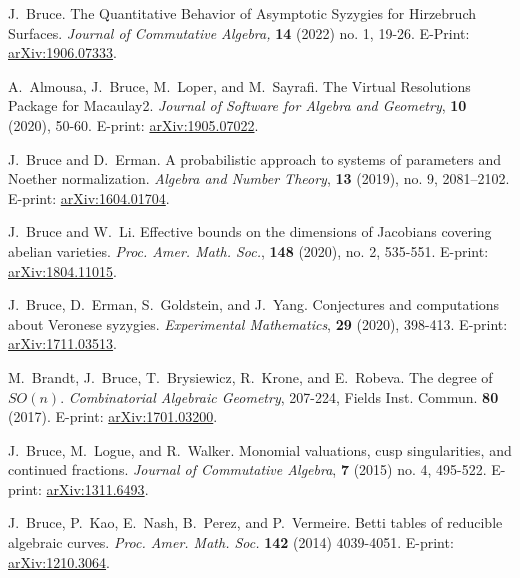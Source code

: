 \documentclass[letterpaper,11pt]{article}
\begin{document}
\begin{revnumerate}[20]
\item
	J.~Bruce. The Quantitative Behavior of Asymptotic Syzygies for Hirzebruch Surfaces. {\it Journal of Commutative Algebra,} \textbf{14} (2022) no. 1, 19-26. E-Print:  \hyperref{http://arxiv.org/abs/1906.07333}{}{}{arXiv:1906.07333}.
	
\item
	A.~Almousa, J.~Bruce, M.~Loper, and M.~Sayrafi. The Virtual Resolutions Package for Macaulay2.  {\it Journal of Software for Algebra and Geometry}, \textbf{10} (2020), 50-60. E-print: \hyperref{http://arxiv.org/abs/1905.07022}{}{}{arXiv:1905.07022}.
	
\item
	J.~Bruce and D.~Erman. A probabilistic approach to systems of parameters and Noether normalization. {\it Algebra and Number Theory}, \textbf{13} (2019), no. 9, 2081–2102. E-print: \hyperref{http://arxiv.org/abs/1604.01704}{}{}{arXiv:1604.01704}.
	
\item
	J.~Bruce and W.~Li. Effective bounds on the dimensions of Jacobians covering abelian varieties.  {\it Proc. Amer. Math. Soc.}, \textbf{148} (2020), no. 2, 535-551. E-print: \hyperref{https://arxiv.org/abs/1804.11015}{}{}{arXiv:1804.11015}.
			
\item
	J.~Bruce, D.~Erman, S.~Goldstein, and J.~Yang. Conjectures and computations about Veronese syzygies.  {\it Experimental Mathematics}, \textbf{29} (2020), 398-413. E-print: \hyperref{https://arxiv.org/abs/1711.03513}{}{}{arXiv:1711.03513}.
	
\item
	M.~Brandt, J.~Bruce, T.~Brysiewicz, R.~Krone, and E.~Robeva. The degree of $SO(n)$. {\it Combinatorial Algebraic Geometry}, 207-224, Fields Inst. Commun. \textbf{80} (2017). E-print: \hyperref{https://arxiv.org/abs/1701.03200}{}{}{arXiv:1701.03200}.
	
\item
	J.~Bruce, M.~Logue, and R.~Walker. Monomial valuations, cusp singularities, and continued fractions. {\it Journal of Commutative Algebra}, \textbf{7} (2015) no. 4, 495-522. E-print: \hyperref{http://arxiv.org/abs/1311.6493}{}{}{arXiv:1311.6493}.

\item
	J.~Bruce, P.~Kao, E.~Nash, B.~Perez, and P.~Vermeire. Betti tables of reducible algebraic curves. {\it Proc. Amer. Math. Soc.} \textbf{142} (2014) 4039-4051. E-print: \hyperref{http://arxiv.org/abs/1210.3064}{}{}{arXiv:1210.3064}.
\end{revnumerate}
\end{document}
